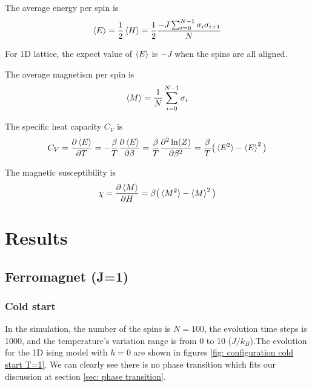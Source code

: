 \documentclass[12pt]{article}
\begin{document}
	The average energy per spin is
	\begin{align}\label{equ: average energy per spin}
		\braket{E}=\frac{1}{2}\braket{H}=\frac{1}{2}\frac{-J \sum_{i=0}^{N-1} \sigma_i \sigma_{i+1}}{N}
	\end{align}
	
	For 1D lattice, the expect value of $\braket{E}$ is $-J$ when the spins are all aligned.
	
	The average magnetism per spin is 
	\begin{align}\label{equ: average magnetization per spin}
		\braket{M}=\frac{1}{N}\sum_{i=0}^{N-1} \sigma_i
	\end{align}
	
	The specific heat capacity $C_V$ is 
	\begin{align}\label{equ: spefic heat capacity}
		C_V=\frac{\partial \braket{E}}{\partial T}=-\frac{\beta}{T} \frac{\partial \braket{E}}{\partial \beta}=\frac{\beta}{T}\frac{\partial ^2 \ln(Z)}{\partial \beta ^2}=\frac{\beta}{T}\big(\braket{E^2}-\braket{E}^2\big)
	\end{align}
	
	The magnetic susceptibility is 
	\begin{align}\label{equ: susceptibility}
		\chi=\frac{\partial \braket{M}}{\partial H}=\beta \big(\braket{M^2}-\braket{M}^2 \big)
	\end{align}
	
	\section{Results}
	\label{sec: results}
	\subsection{Ferromagnet (J=1)}
	\label{equ: results for ferromagnet}
	\subsubsection{Cold start}
	\label{equ: ferromagnet cold start}
	
	In the simulation, the number of the spins is $N=100$, the evolution time steps is 1000, and the temperature's variation range is from 0 to 10 ($J/k_B$).The evolution for the 1D ising model with $h=0$ are shown in figures \ref{fig: configuration cold start T=1}. We can clearly see there is no phase transition which fits our discussion at section \ref{sec: phase transition}.
	
\end{document}
